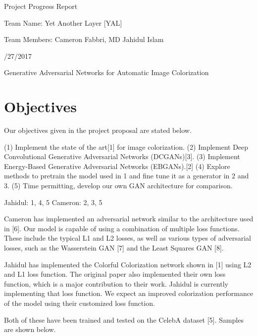 \documentclass[11pt]{article}
\begin{document}
\centerline{\sc \large Project Progress Report}
\vspace{.5pc}
\centerline{\sc Team Name: Yet Another Layer [YAL]}
\centerline{\sc Team Members: Cameron Fabbri, MD Jahidul Islam}
\centerline{/27/2017}
\vspace{2pc}

\centerline{\sc \large Generative Adversarial Networks for Automatic Image Colorization }

\section{Objectives}
Our objectives given in the project proposal are stated below. 

\noindent (1) Implement the state of the art[1] for image colorization. \newline
\noindent (2) Implement Deep Convolutional Generative Adversarial Networks (DCGANs)[3]. \newline
\noindent (3) Implement Energy-Based Generative Adversarial Networks (EBGANs).[2] \newline
\noindent (4) Explore methods to pretrain the model used in 1 and fine tune it as a generator in 2 and 3.
\newline
\noindent (5) Time permitting, develop our own GAN architecture for comparison. \newline

\noindent Jahidul: 1, 4, 5 \newline
\noindent Cameron: 2, 3, 5 \newline

\noindent Cameron has implemented an adversarial network similar to the architecture used in [6]. Our model
is capable of using a combination of multiple loss functions. These include the typical L1 and L2 losses,
as well as various types of adversarial losses, such as the Wasserstein GAN [7] and the Least Squares GAN
[8]. 
\vspace{1pc}

\noindent Jahidul has implemented the Colorful Colorization network shown in [1] using L2 and L1 loss function. The original paper also implemented their own loss function, which is a major contribution to their work. Jahidul is currently implementing that loss function. We expect an improved colorization performance of the model using their customized loss function. 
\vspace{3mm}

\noindent Both of these have been trained and tested on the CelebA dataset [5]. Samples are shown below.
\end{document}
